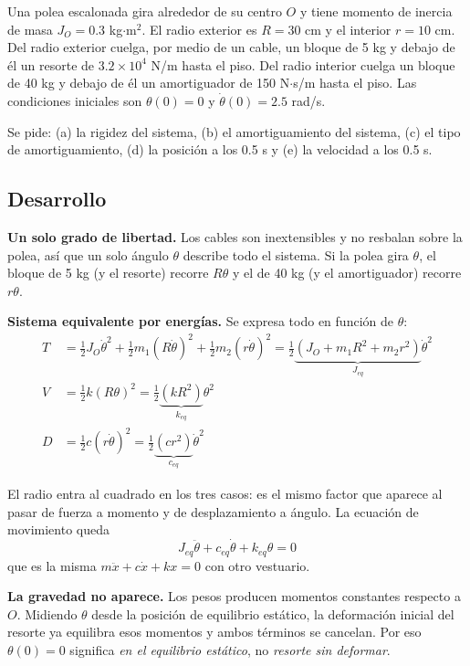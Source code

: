 \documentclass[12pt,letterpaper]{article}
\begin{document}
Una polea escalonada gira alrededor de su centro $O$ y tiene momento de inercia de
masa $J_O = 0.3$ kg$\cdot$m$^2$. El radio exterior es $R = 30$ cm y el interior
$r = 10$ cm. Del radio exterior cuelga, por medio de un cable, un bloque de 5 kg y
debajo de él un resorte de $3.2\times10^{4}$ N/m hasta el piso. Del radio interior
cuelga un bloque de 40 kg y debajo de él un amortiguador de 150 N$\cdot$s/m hasta el
piso. Las condiciones iniciales son $\theta(0) = 0$ y $\dot{\theta}(0) = 2.5$ rad/s.

Se pide: (a) la rigidez del sistema, (b) el amortiguamiento del sistema, (c) el tipo
de amortiguamiento, (d) la posición a los 0.5 s y (e) la velocidad a los 0.5 s.

\subsection{Desarrollo}

\textbf{Un solo grado de libertad.} Los cables son inextensibles y no resbalan sobre
la polea, así que un solo ángulo $\theta$ describe todo el sistema. Si la polea gira
$\theta$, el bloque de 5 kg (y el resorte) recorre $R\theta$ y el de 40 kg (y el
amortiguador) recorre $r\theta$.

\textbf{Sistema equivalente por energías.} Se expresa todo en función de $\theta$:
\begin{align}
T &= \tfrac{1}{2}J_O\dot{\theta}^2 + \tfrac{1}{2}m_1(R\dot{\theta})^2
   + \tfrac{1}{2}m_2(r\dot{\theta})^2
   = \tfrac{1}{2}\underbrace{\left(J_O + m_1R^2 + m_2r^2\right)}_{J_{eq}}\dot{\theta}^2 \\
V &= \tfrac{1}{2}k(R\theta)^2 = \tfrac{1}{2}\underbrace{\left(kR^2\right)}_{k_{eq}}\theta^2 \\
D &= \tfrac{1}{2}c(r\dot{\theta})^2 = \tfrac{1}{2}\underbrace{\left(cr^2\right)}_{c_{eq}}\dot{\theta}^2
\end{align}

El radio entra al cuadrado en los tres casos: es el mismo factor que aparece al pasar
de fuerza a momento y de desplazamiento a ángulo. La ecuación de movimiento queda
\begin{equation}
J_{eq}\ddot{\theta} + c_{eq}\dot{\theta} + k_{eq}\theta = 0
\end{equation}
que es la misma $m\ddot{x} + c\dot{x} + kx = 0$ con otro vestuario.

\textbf{La gravedad no aparece.} Los pesos producen momentos constantes respecto a
$O$. Midiendo $\theta$ desde la posición de equilibrio estático, la deformación
inicial del resorte ya equilibra esos momentos y ambos términos se cancelan. Por eso
$\theta(0) = 0$ significa \emph{en el equilibrio estático}, no \emph{resorte sin
deformar}.
\end{document}
